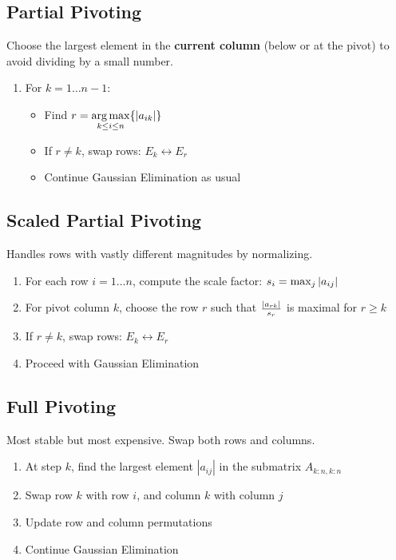 \documentclass[8pt, letterpaper]{extarticle}
\begin{document}
\begin{multicols*}{3}
  \subsection{Partial Pivoting}
  Choose the largest element in the \textbf{current column} (below or at the pivot) to avoid dividing by a small number.
  \begin{enumerate}
    \item For $k = 1 \dots n-1$:
      \begin{itemize}
        \item Find $r = \underset{k \leq i \leq n}{\arg\max} \Bqty{|a_{ik}|}$
        \item If $r \neq k$, swap rows: $E_k \leftrightarrow E_r$
        \item Continue Gaussian Elimination as usual
      \end{itemize}
  \end{enumerate}

  \subsection{Scaled Partial Pivoting}
  Handles rows with vastly different magnitudes by normalizing.
  \begin{enumerate}
    \item For each row $i = 1 \dots n$, compute the scale factor: $s_i = \max_j \abs{a_{ij}}$
    \item For pivot column $k$, choose the row $r$ such that $\frac{\abs{a_{rk}}}{s_r}$ is maximal for $r \geq k$
    \item If $r \neq k$, swap rows: $E_k \leftrightarrow E_r$
    \item Proceed with Gaussian Elimination
  \end{enumerate}

  \subsection{Full Pivoting}
  Most stable but most expensive. Swap both rows and columns.
  \begin{enumerate}
    \item At step $k$, find the largest element $|a_{ij}|$ in the submatrix $A_{k:n,k:n}$
    \item Swap row $k$ with row $i$, and column $k$ with column $j$
    \item Update row and column permutations
    \item Continue Gaussian Elimination
  \end{enumerate}


\end{multicols*}
\end{document}
